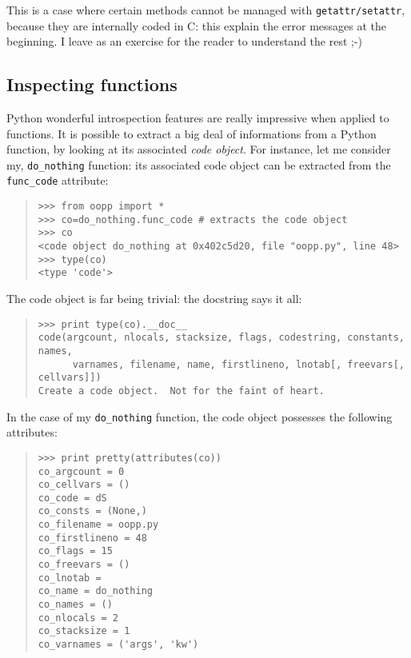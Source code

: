 \documentclass[10pt,english]{article}
\begin{document}
This is a case where certain methods cannot be managed with 
\texttt{getattr/setattr}, because they are internally coded in C: this
explain the error messages at the beginning. I leave as an exercise 
for the reader to understand the rest ;-)



\hypertarget{inspecting-functions}{}
\subsection*{Inspecting functions}

Python wonderful introspection features are really impressive when applied
to functions. It is possible to extract a big deal of informations
from a Python function, by looking at its associated \emph{code object}.
For instance, let me consider  my, \texttt{do{\_}nothing} function: its associated
code object can be extracted from the \texttt{func{\_}code} attribute:
\begin{quote}
\begin{verbatim}>>> from oopp import *
>>> co=do_nothing.func_code # extracts the code object
>>> co
<code object do_nothing at 0x402c5d20, file "oopp.py", line 48>
>>> type(co)
<type 'code'>\end{verbatim}
\end{quote}

The code object is far being trivial: the docstring says it all:
\begin{quote}
\begin{verbatim}>>> print type(co).__doc__
code(argcount, nlocals, stacksize, flags, codestring, constants, names,
      varnames, filename, name, firstlineno, lnotab[, freevars[, cellvars]])
Create a code object.  Not for the faint of heart.\end{verbatim}
\end{quote}

In the case of my \texttt{do{\_}nothing} function, the code object 
possesses the following attributes:
\begin{quote}
\begin{verbatim}>>> print pretty(attributes(co))
co_argcount = 0
co_cellvars = ()
co_code = dS
co_consts = (None,)
co_filename = oopp.py
co_firstlineno = 48
co_flags = 15
co_freevars = ()
co_lnotab =
co_name = do_nothing
co_names = ()
co_nlocals = 2
co_stacksize = 1
co_varnames = ('args', 'kw')\end{verbatim}
\end{quote}
\end{document}
